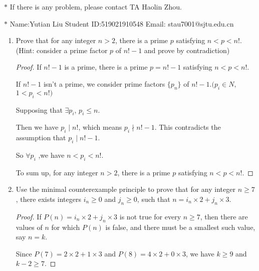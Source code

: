 \documentclass[12pt,a4paper]{article}
\theoremstyle{definition}
\begin{document}
\noindent

\noindent{}
\begin{center}
\footnotesize{\color{red}$*$ If there is any problem, please contact TA Haolin Zhou.}

\footnotesize{\color{blue}$*$ Name:Yutian Liu \quad Student ID:519021910548 \quad Email: stau7001@sjtu.edu.cn}
\end{center}

\begin{enumerate}
    \item
    Prove that for any integer $n>2$, there is a prime $p$ satisfying $n<p<n!$. {\color{blue}(Hint: consider a prime factor $p$ of $n!-1$ and prove by contradiction)}
    \begin{proof}
        If $n!-1$ is a prime, there is a prime $p=n!-1$ satisfying $n<p<n!$.

        If $n!-1$ isn't a prime, we consider prime factors $\{p_n\}$ of $n!-1$.$(p_i\in N,$ $ 1<p_i<n!)$

        Supposing that $\exists p_i$, $ p_i\le n$.

        Then we have $p_i\mid n!$, which means $p_i\nmid n!-1$. This contradicts the assumption that $p_i\mid n!-1$.

        So $\forall p_i$ ,we have $n<p_i<n!$.

        To sum up, for any integer $n>2$, there is a prime $p$ satisfying $n<p<n!$. 

    \end{proof}

    \item
    Use the minimal counterexample principle to prove that for any integer $n\ge 7$, there exists integers $i_n\ge 0$ and $j_n\ge 0$, such that $n = i_n \times 2 + j_n \times 3$.
    \begin{proof}
        If $P(n) = i_n \times 2 + j_n \times 3$ is not true for every $n\ge 7$, then there are values of $n$ for which $P(n)$ is false, and there must be a smallest such value, say $n=k$.

        Since $ P(7) = 2 \times 2+ 1 \times 3$ and $P(8)=4\times 2 +0\times 3$, we have $k\ge9$ and $k-2\ge 7$.


\end{proof}
\end{enumerate}
\end{document}
